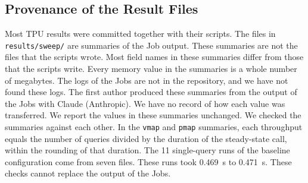 \subsection{Provenance of the Result Files}\label{sec:records}
Most TPU results were committed together with their scripts. The files in \texttt{results/sweep/} are summaries of the
Job output. These summaries are not the files that the scripts wrote. Most field names in these summaries differ from
those that the scripts write.
Every memory value in the summaries is a whole number of megabytes. %
The logs of the Jobs are not in the repository, and we have not found these logs. The first author produced these
summaries from the output of the Jobs with Claude (Anthropic). We have no record of how each value was transferred. We
report the values in these summaries unchanged. We checked the summaries against each other. In the \texttt{vmap} and
\texttt{pmap} summaries, each throughput equals the number of queries divided by the duration of the steady-state call,
within the rounding of that duration.
The 11 single-query runs of the baseline configuration come from seven files. These runs took 0.469~s to 0.471~s. %
These checks cannot replace the output of the Jobs.
